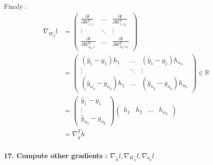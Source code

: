 \documentclass{article}
\theoremstyle{plain}%
\theoremstyle{definition}
\theoremstyle{remark}
\begin{document}
Finaly : 
\begin{align*}
    \nabla_{W_y} l &= \begin{pmatrix}
        \frac{\partial l}{\partial W^y_{1,1}} & \dots & \frac{\partial l}{\partial W^y_{1,n_h}}\\
        \vdots & \ddots & \vdots \\
        \frac{\partial l}{\partial W^y_{n_y,1}} & \dots & \frac{\partial l}{\partial W^y_{n_y, n_h}}
    \end{pmatrix} \\
    &= \begin{pmatrix}
        (\hat{y}_1 - y_1) h_{1} & \dots & (\hat{y}_1 - y_1) h_{n_h} \\
        \vdots & \ddots & \vdots \\
        (\hat{y}_{n_y} - y_{n_y}) h_{1} & \dots & (\hat{y}_{n_y} - y_{n_y}) h_{n_h}
    \end{pmatrix} \in \mathbb{R}^{}\\
    &= \begin{pmatrix}
        \hat{y}_1 - y_1 \\
        \vdots \\
        \hat{y}_{n_y} - y_{n_y}
    \end{pmatrix} \begin{pmatrix}
        h_1 & h_2 & \dots & h_{n_h}
    \end{pmatrix} \\
    &= \nabla _{\tilde{y}} ^T h
\end{align*}



\paragraph{17. Compute other gradients : $ \nabla _{\tilde{h}} l, \nabla _{W_h} l, \nabla_{b_h}l $ }
\end{document}
